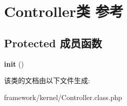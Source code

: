 \hypertarget{classController}{\section{Controller类 参考}
\label{classController}
}
\subsection*{Protected 成员函数}
\begin{DoxyCompactItemize}
\item 
\hypertarget{classController_af71b414389f649229743b8e8b16e1ee8}{{\bfseries init} ()}\label{classController_af71b414389f649229743b8e8b16e1ee8}

\end{DoxyCompactItemize}


该类的文档由以下文件生成\+:\begin{DoxyCompactItemize}
\item 
framework/kernel/Controller.\+class.\+php\end{DoxyCompactItemize}
